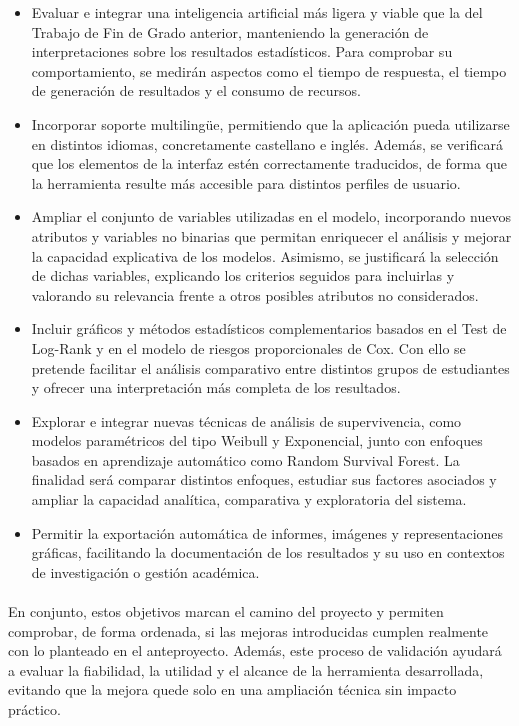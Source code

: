 \begin{itemize}
    \item Evaluar e integrar una inteligencia artificial más ligera y viable que la del Trabajo de Fin de Grado anterior, manteniendo la generación de interpretaciones sobre los resultados estadísticos. Para comprobar su comportamiento, se medirán aspectos como el tiempo de respuesta, el tiempo de generación de resultados y el consumo de recursos.
    
    \item Incorporar soporte multilingüe, permitiendo que la aplicación pueda utilizarse en distintos idiomas, concretamente castellano e inglés. Además, se verificará que los elementos de la interfaz estén correctamente traducidos, de forma que la herramienta resulte más accesible para distintos perfiles de usuario.
    
    \item Ampliar el conjunto de variables utilizadas en el modelo, incorporando nuevos atributos y variables no binarias que permitan enriquecer el análisis y mejorar la capacidad explicativa de los modelos. Asimismo, se justificará la selección de dichas variables, explicando los criterios seguidos para incluirlas y valorando su relevancia frente a otros posibles atributos no considerados.
    
    \item Incluir gráficos y métodos estadísticos complementarios basados en el Test de Log-Rank y en el modelo de riesgos proporcionales de Cox. Con ello se pretende facilitar el análisis comparativo entre distintos grupos de estudiantes y ofrecer una interpretación más completa de los resultados.
    
    \item Explorar e integrar nuevas técnicas de análisis de supervivencia, como modelos paramétricos del tipo Weibull y Exponencial, junto con enfoques basados en aprendizaje automático como Random Survival Forest. La finalidad será comparar distintos enfoques, estudiar sus factores asociados y ampliar la capacidad analítica, comparativa y exploratoria del sistema.
    
    \item Permitir la exportación automática de informes, imágenes y representaciones gráficas, facilitando la documentación de los resultados y su uso en contextos de investigación o gestión académica.
\end{itemize}

\paragraph*{}En conjunto, estos objetivos marcan el camino del proyecto y permiten comprobar, de forma ordenada, si las mejoras introducidas cumplen realmente con lo planteado en el anteproyecto. Además, este proceso de validación ayudará a evaluar la fiabilidad, la utilidad y el alcance de la herramienta desarrollada, evitando que la mejora quede solo en una ampliación técnica sin impacto práctico.
